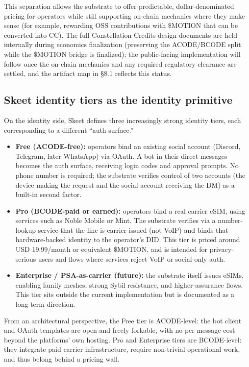 This separation allows the substrate to offer predictable,
dollar-denominated pricing for operators while still supporting on-chain
mechanics where they make sense (for example, rewarding OSS
contributions with \$MOTION that can be converted into CC). The full
Constellation Credits design documents are held internally during
economics finalization (preserving the ACODE/BCODE split while the
\$MOTION bridge is finalized); the public-facing implementation will
follow once the on-chain mechanics and any required regulatory clearance
are settled, and the artifact map in §8.1 reflects this status.

\subsection{Skeet identity tiers as the identity
primitive}\label{skeet-identity-tiers-as-the-identity-primitive}

On the identity side, Skeet defines three increasingly strong identity
tiers, each corresponding to a different ``auth surface.''

\begin{itemize}
\tightlist
\item
  \textbf{Free (ACODE-free):} operators bind an existing social account
  (Discord, Telegram, later WhatsApp) via OAuth. A bot in their direct
  messages becomes the auth surface, receiving login codes and approval
  prompts. No phone number is required; the substrate verifies control
  of two accounts (the device making the request and the social account
  receiving the DM) as a built-in second factor.
\item
  \textbf{Pro (BCODE-paid or earned):} operators bind a real carrier
  eSIM, using services such as Noble Mobile or Mint. The substrate
  verifies via a number-lookup service that the line is carrier-issued
  (not VoIP) and binds that hardware-backed identity to the operator's
  DID. This tier is priced around USD 19.99/month or equivalent
  \$MOTION, and is intended for privacy-serious users and flows where
  services reject VoIP or social-only auth.
\item
  \textbf{Enterprise / PSA-as-carrier (future):} the substrate itself
  issues eSIMs, enabling family meshes, strong Sybil resistance, and
  higher-assurance flows. This tier sits outside the current
  implementation but is documented as a long-term direction.
\end{itemize}

From an architectural perspective, the Free tier is ACODE-level: the bot
client and OAuth templates are open and freely forkable, with no
per-message cost beyond the platforms' own hosting. Pro and Enterprise
tiers are BCODE-level: they integrate paid carrier infrastructure,
require non-trivial operational work, and thus belong behind a pricing
wall.

